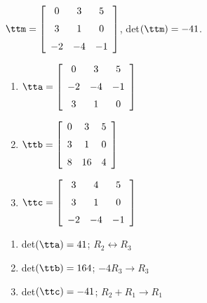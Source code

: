 {$\ttm=\left[ \begin {array}{ccc} 0&3&5\\\noalign{\medskip}3&1&0
\\\noalign{\medskip}-2&-4&-1\end {array} \right] $, \quad det$(\ttm)=-41$.
\begin{enumerate}
\item $\tta = \left[ \begin {array}{ccc} 0&3&5\\\noalign{\medskip}-2&-4&-1
\\\noalign{\medskip}3&1&0\end {array} \right] $
\item	$\ttb = \left[ \begin {array}{ccc} 0&3&5\\\noalign{\medskip}3&1&0
\\\noalign{\medskip}8&16&4\end {array} \right] $
\item	$\ttc = \left[ \begin {array}{ccc} 3&4&5\\\noalign{\medskip}3&1&0
\\\noalign{\medskip}-2&-4&-1\end {array} \right] $
\end{enumerate}} 
{\begin{enumerate}
\item det$(\tta) = 41$; $R_2\leftrightarrow R_3$
\item det$(\ttb) = 164$; $-4R_3\rightarrow R_3$
\item det$(\ttc) = -41$; $R_2+R_1\rightarrow R_1$
\end{enumerate}}



  

